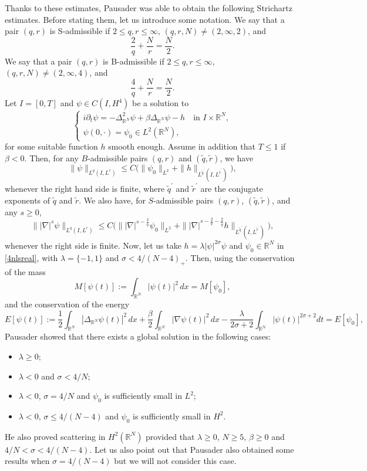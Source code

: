 \documentclass[10pt,leqno]{amsart}
\numberwithin{equation}{section}
\newcommand{\field}[1]{\mathbb{#1}}
\newcommand{\R}{\field{R}}          		%
\begin{document}
Thanks to these estimates, Pausader was able to obtain the following Strichartz estimates. Before stating them, let us introduce some notation. We say that a pair $(q,r)$ is S-admissible if $2\leq q,r\leq \infty$, $(q,r,N)\neq (2,\infty , 2)$, and
$$\dfrac{2}{q}+ \dfrac{N}{r}=\dfrac{N}{2}.$$
We say that a pair $(q,r)$ is B-admissible if $2\leq q,r\leq \infty$, $(q,r,N)\neq (2,\infty , 4)$, and
$$\dfrac{4}{q}+ \dfrac{N}{r}=\dfrac{N}{2}.$$
Let $I=[0,T]$ and $\psi\in C(I,H^{4})$ be a solution to 
\begin{equation}
\label{4nlsreal}
\begin{cases}
i\partial_t\psi =- \Delta_{\R^N}^2\psi +\beta\Delta_{\R^N}\psi -h\quad\text{in }I\times \R^N,\\
\psi(0,\cdot)=\psi_0\in L^2 (\R^N),
\end{cases}
\end{equation}
for some suitable function $h$ smooth enough. Assume in addition that $T\leq 1$ if $\beta <0$. Then, for any $B$-admissible pairs $(q,r)$ and $(\tilde{q} ,\tilde{r})$, we have
\begin{equation}
\label{strireal}
\|\psi\|_{L^q (I,L^r)} \leq C \big(\|\psi_0\|_{L^2} + \|h\|_{L^{\tilde{q}^\prime } (I,L^{\tilde{r}^\prime })}\big),
\end{equation}
whenever the right hand side is finite, where $\tilde{q}^\prime$ and $\tilde{r}^\prime$ are the conjugate exponents of $\tilde{q}$ and $\tilde{r}$. We also have, for $S$-admissible pairs $(q,r)$, $(\tilde{q} ,\tilde{r})$, and any $s\geq 0$,
$$\||\nabla|^s \psi\|_{L^q (I,L^r)} \leq C \big(\||\nabla |^{s-\frac{2}{q}}\psi_0\|_{L^2} + \||\nabla|^{s-\frac{2}{q} - \frac{2}{\tilde{q}}}h\|_{L^{\tilde{q}^\prime } (I,L^{\tilde{r}^\prime })}\big),$$
whenever the right side is finite. Now, let us take $h=\lambda |\psi|^{2\sigma}\psi$ and $\psi_0 \in \R^N$ in \eqref{4nlsreal}, with $\lambda=\{-1,1\}$ and $\sigma <4/(N-4)_+ $. 
 Then, using the conservation of the mass
\[ M[\psi (t)]:=\int_{\R^N}|\psi (t)|^2 \,dx=M[\psi_0],
\]
and the conservation of the energy
\[
E[\psi (t)] :=\frac{1}{2}\int_{\R^N}|\Delta_{\R^N} \psi (t)|^2\, dx + \frac{\beta}{2}\int_{\R^N}|\nabla\psi (t)|^2\, dx
-\frac{\lambda}{2\sigma +2}\int_{\R^N}|\psi (t)|^{2\sigma+2}dt= E[\psi_0],
\]
Pausader \cite{MR2505703} showed that there exists a global solution in the following cases:
\begin{itemize}
\item $\lambda \geq 0$;
\item $\lambda <0$ and $\sigma< 4/N$;
\item $\lambda <0$, $\sigma=4/N$ and $\psi_0$ is sufficiently small in $L^2$;
\item $\lambda <0$, $\sigma \leq 4/(N-4) $ and $\psi_0$ is sufficiently small in $H^2$.
\end{itemize}
He also proved scattering in $H^2 (\R^N)$ provided that $\lambda \geq 0$, $N\geq 5$, $\beta \geq 0$ and $4/N < \sigma < 4/(N-4)$. Let us also point out that Pausader also obtained some results when $\sigma= 4/(N-4)$ but we will not consider this case.
\end{document}
